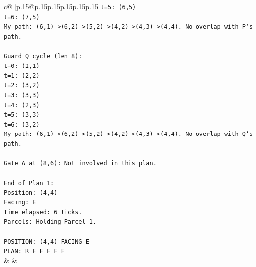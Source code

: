 \documentclass{article}
\begin{document}
{\begin{supertabular}{c@{$\;$}|p{.15\linewidth}@{}p{.15\linewidth}p{.15\linewidth}p{.15\linewidth}p{.15\linewidth}p{.15\linewidth}}
{{{\texttt{t=5: (6,5)} \\
\texttt{t=6: (7,5)} \\
\texttt{My path: (6,1){-}>(6,2){-}>(5,2){-}>(4,2){-}>(4,3){-}>(4,4). No overlap with P's path.} \\
\\ 
\texttt{Guard Q cycle (len 8):} \\
\texttt{t=0: (2,1)} \\
\texttt{t=1: (2,2)} \\
\texttt{t=2: (3,2)} \\
\texttt{t=3: (3,3)} \\
\texttt{t=4: (2,3)} \\
\texttt{t=5: (3,3)} \\
\texttt{t=6: (3,2)} \\
\texttt{My path: (6,1){-}>(6,2){-}>(5,2){-}>(4,2){-}>(4,3){-}>(4,4). No overlap with Q's path.} \\
\\ 
\texttt{Gate A at (8,6): Not involved in this plan.} \\
\\ 
\texttt{End of Plan 1:} \\
\texttt{Position: (4,4)} \\
\texttt{Facing: E} \\
\texttt{Time elapsed: 6 ticks.} \\
\texttt{Parcels: Holding Parcel 1.} \\
\\ 
\texttt{POSITION: (4,4) FACING E} \\
\texttt{PLAN: R F F F F F} \\
            }
        }
    }
    & & \\ \\


\end{supertabular}}
\end{document}
